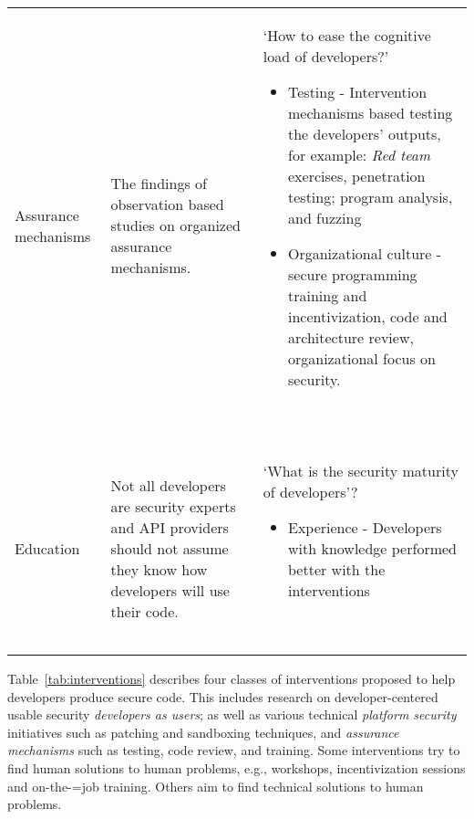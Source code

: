 \documentclass[conference]{IEEEtran}
\begin{document}
\begin{table*}
\begin{tabular}{p{} p{} p{}}
    Assurance mechanisms & The findings of observation based studies on organized assurance mechanisms. & ‘How to ease the cognitive load of developers?’
    \begin{itemize}
    \item Testing - Intervention mechanisms based testing the developers' outputs, for example: \emph{Red team} exercises, penetration testing; program analysis, and fuzzing
    \item Organizational culture - secure programming training and incentivization, code and architecture review, organizational focus on security.
    \end{itemize}
                                                                                                          ~\cite{ayewah2008,weir2020,rahman2016,weir2016,adoption2014,witschey2015,jose2016,tondel2008,haney2018,thomas2018,poller2017, zhuaside2013,nguyen2017}\\
    \addlinespace
    Education &  Not all developers are security experts and API providers should not assume they know how developers will use their code. & `What is the security maturity of developers'?
    \begin{itemize}
    \item Experience - Developers with knowledge performed better with the interventions
    \end{itemize}
                                                                                                                                              ~\cite{madiha2017,zhu2014,tyler2015,whitney2015,lipford2016,oltroggepin2015,loiacono2017ido,naiakshina2019,haney2018,  witschey2015,acarusability2017,weir2020,adoption2014,linden2020,hala2016}\\
    \bottomrule
  \end{tabular}
\end{table*}
Table~\ref{tab:interventions} describes four classes of interventions proposed to help developers produce secure code. This includes research on developer-centered usable security \emph{developers as users}; as well as various technical \emph{platform security} initiatives such as patching and sandboxing techniques, and \emph{assurance mechanisms} such as testing, code review, and training.  Some interventions try to find human solutions to human problems, e.g., workshops, incentivization sessions and on-the-=job training. Others aim to find technical solutions to human problems. %
\end{document}
